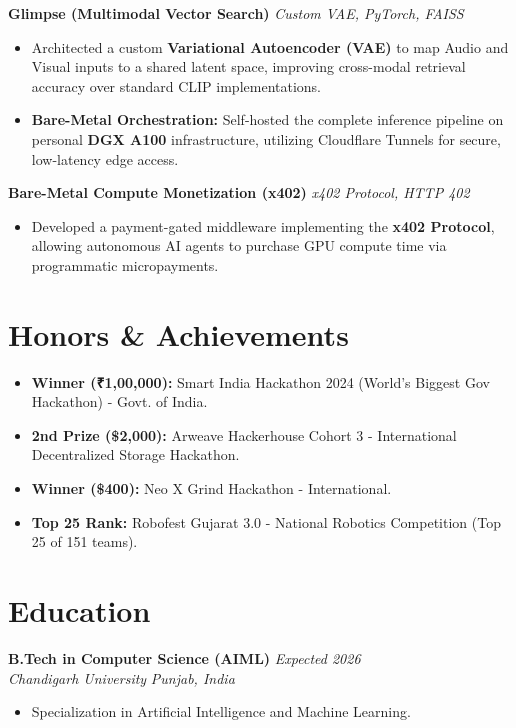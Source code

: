 \documentclass[a4paper,11pt]{article}
\newcommand{\entry}[4]{
    \par\vspace{0.4em}\noindent
    {\textbf{\large #1}} \hfill {\textit{\color{secondary} #2}} \\
    {\textit{\color{secondary} #3}} \hfill {\textit{\small #4}} \par
    \vspace{0.1em}
}
\newenvironment{tightlist}{
    \begin{itemize}
    \setlength{\itemsep}{1pt}
    \setlength{\parskip}{0pt}
    \setlength{\parsep}{0pt}
}{
    \end{itemize}
}
\begin{document}
\noindent
\textbf{Glimpse (Multimodal Vector Search)} \hfill \textit{Custom VAE, PyTorch, FAISS}
\begin{itemize} \itemsep0em
    \item Architected a custom \textbf{Variational Autoencoder (VAE)} to map Audio and Visual inputs to a shared latent space, improving cross-modal retrieval accuracy over standard CLIP implementations.
    \item \textbf{Bare-Metal Orchestration:} Self-hosted the complete inference pipeline on personal \textbf{DGX A100} infrastructure, utilizing Cloudflare Tunnels for secure, low-latency edge access.
\end{itemize}
\vspace{2mm}

\noindent
\textbf{Bare-Metal Compute Monetization (x402)} \hfill \textit{x402 Protocol, HTTP 402}
\begin{itemize} \itemsep0em
    \item Developed a payment-gated middleware implementing the \textbf{x402 Protocol}, allowing autonomous AI agents to purchase GPU compute time via programmatic micropayments.
\end{itemize}

\section*{Honors \& Achievements}
\begin{tightlist}
    \item \textbf{Winner (₹1,00,000):} Smart India Hackathon 2024 (World's Biggest Gov Hackathon) - Govt. of India.
    \item \textbf{2nd Prize (\$2,000):} Arweave Hackerhouse Cohort 3 - International Decentralized Storage Hackathon.
    \item \textbf{Winner (\$400):} Neo X Grind Hackathon - International.
    \item \textbf{Top 25 Rank:} Robofest Gujarat 3.0 - National Robotics Competition (Top 25 of 151 teams).
\end{tightlist}

\section*{Education}
\entry{B.Tech in Computer Science (AIML)}{Expected 2026}{Chandigarh University}{Punjab, India}
\begin{tightlist}
    \item Specialization in Artificial Intelligence and Machine Learning.
\end{tightlist}
\end{document}
